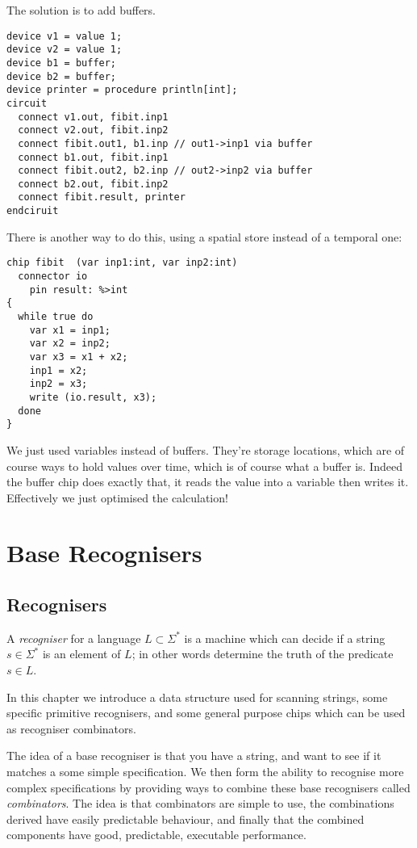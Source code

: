 \documentclass[oneside]{book}
\begin{document}
The solution is to add buffers.

\begin{verbatim}
device v1 = value 1;
device v2 = value 1;
device b1 = buffer;
device b2 = buffer;
device printer = procedure println[int];
circuit
  connect v1.out, fibit.inp1
  connect v2.out, fibit.inp2
  connect fibit.out1, b1.inp // out1->inp1 via buffer
  connect b1.out, fibit.inp1
  connect fibit.out2, b2.inp // out2->inp2 via buffer
  connect b2.out, fibit.inp2
  connect fibit.result, printer
endciruit
\end{verbatim}

There is another way to do this, using a spatial store instead
of a temporal one:

\begin{verbatim}
chip fibit  (var inp1:int, var inp2:int)
  connector io
    pin result: %>int
{
  while true do
    var x1 = inp1;
    var x2 = inp2;
    var x3 = x1 + x2;
    inp1 = x2;
    inp2 = x3;
    write (io.result, x3);
  done
}
\end{verbatim}

We just used variables instead of buffers. They're storage locations,
which are of course ways to hold values over time, which is of course
what a buffer is. Indeed the buffer chip does exactly that,
it reads the value into a variable then writes it. Effectively
we just optimised the calculation!



\chapter{Base Recognisers}
\section{Recognisers}
A {\em recogniser} for a language $L \subset \Sigma^\ast$ is a machine
which can decide if a string $s\in \Sigma^\ast$ is an element of $L$;
in other words determine the truth of the predicate $s\in L$.

In this chapter we introduce a data structure used for scanning strings,
some specific primitive recognisers, and some general purpose chips which
can be used as recogniser combinators.

The idea of a base recogniser is that you have a string, and want to see if
it matches a some simple specification. We then form the ability to recognise
more complex specifications by providing ways to combine these base recognisers
called {\em combinators}. The idea is that combinators are simple to use,
the combinations derived have easily predictable behaviour, and finally that
the combined components have good, predictable, executable performance.
\end{document}
